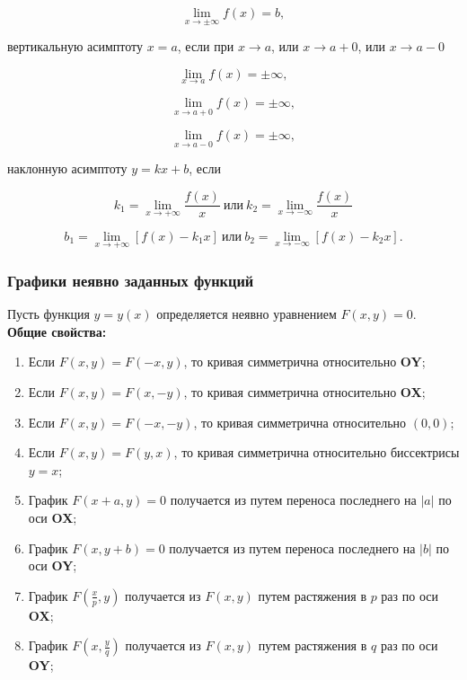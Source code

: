 \[
\lim_{x \rightarrow \pm \infty} f(x) = b,
\]

вертикальную асимптоту $x = a$, если при $x \rightarrow a$, или $x \rightarrow a + 0$, или $x \rightarrow a - 0$

\[
\lim_{x \rightarrow a} f(x) = \pm \infty,
\]

\[
\lim_{x \rightarrow a + 0} f(x) = \pm \infty,
\]

\[
\lim_{x \rightarrow a - 0} f(x) = \pm \infty,
\]

наклонную асимптоту $y = k x + b$, если

\[
k_{1} = \lim_{x \rightarrow + \infty} \frac{f(x)}{x} \: \mbox{или} \: k_{2} = \lim_{x \rightarrow - \infty} \frac{f(x)}{x}
\]

\[
b_{1} = \lim_{x \rightarrow + \infty} \left[ f(x) - k_{1} x \right] \: \mbox{или} \: b_{2} = \lim_{x \rightarrow - \infty} \left[ f(x) - k_{2} x \right].
\]

\subsubsection{Графики неявно заданных функций}

Пусть функция $y = y \left( x \right)$ определяется неявно уравнением $F \left( x, y \right) = 0$.\\

\textbf{Общие свойства:}

\begin{enumerate}
	\item Если $F \left( x, y \right) = F \left( - x, y \right)$, то кривая симметрична относительно \textbf{OY};
	
	\item Если $F \left( x, y \right) = F \left( x, - y \right)$, то кривая симметрична относительно \textbf{OX};
	
	\item Если $F \left( x, y \right) = F \left( - x, - y \right)$, то кривая симметрична относительно $\left( 0, 0 \right)$;
	
	\item Если $F \left( x, y \right) = F \left( y, x \right)$, то кривая симметрична относительно биссектрисы $y = x$;
	
	\item График $F \left( x + a, y \right) = 0$ получается из  путем переноса последнего на $\left| a \right|$ по оси \textbf{OX};
	
	\item График $F \left( x, y  + b \right) = 0$ получается из  путем переноса последнего на $\left| b \right|$ по оси \textbf{OY};
	
	\item График $F \left( \frac{x}{p}, y \right)$ получается из $F \left( x, y \right)$  путем растяжения в $p$ раз по оси \textbf{OX};
	
	\item График $F \left( x, \frac{y}{q} \right)$ получается из $F \left( x, y \right)$  путем растяжения в $q$ раз по оси \textbf{OY};
\end{enumerate}


